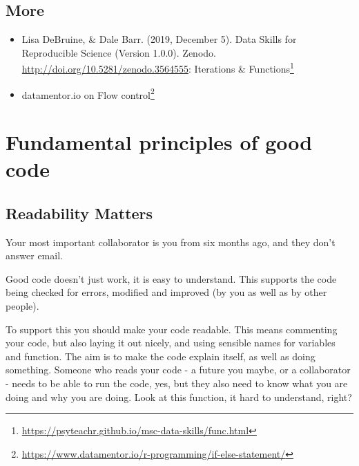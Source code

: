 \documentclass[
  12pt,
  a5paper,
]{book}
\DeclareRobustCommand{\href}[2]{#2\footnote{\url{#1}}}
\providecommand{\tightlist}{%
  \setlength{\itemsep}{0pt}\setlength{\parskip}{0pt}}
\begin{document}
\hypertarget{more}{%
\subsection{More}\label{more}}

\begin{itemize}
\tightlist
\item
  Lisa DeBruine, \& Dale Barr. (2019, December 5). Data Skills for Reproducible Science (Version 1.0.0). Zenodo. \url{http://doi.org/10.5281/zenodo.3564555}: \href{https://psyteachr.github.io/msc-data-skills/func.html}{Iterations \& Functions}
\item
  \href{https://www.datamentor.io/r-programming/if-else-statement/}{datamentor.io on Flow control}
\end{itemize}

\hypertarget{fundamental-principles-of-good-code}{%
\section{Fundamental principles of good code}\label{fundamental-principles-of-good-code}}

\hypertarget{readability-matters}{%
\subsection{Readability Matters}\label{readability-matters}}

Your most important collaborator is you from six months ago, and they don't answer email.

Good code doesn't just work, it is easy to understand. This supports the code being checked for errors, modified and improved (by you as well as by other people).

To support this you should make your code readable. This means commenting your code, but also laying it out nicely, and using sensible names for variables and function. The aim is to make the code explain itself, as well as doing something. Someone who reads your code - a future you maybe, or a collaborator - needs to be able to run the code, yes, but they also need to know what you are doing and why you are doing.
Look at this function, it hard to understand, right?
\end{document}
